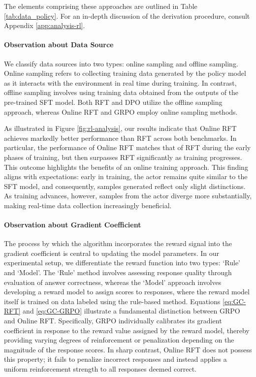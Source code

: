 \begin{itemize}[topsep=0pt]
\begin{itemize}[topsep=0pt]
The elements comprising these approaches are outlined in Table \ref{tab:data_policy}. For an in-depth discussion of the derivation procedure, consult Appendix \ref{app:analysis-rl}.

\paragraph{Observation about Data Source} We classify data sources into two types: online sampling and offline sampling. Online sampling refers to collecting training data generated by the policy model as it interacts with the environment in real time during training. In contrast, offline sampling involves using training data obtained from the outputs of the pre-trained SFT model. Both RFT and DPO utilize the offline sampling approach, whereas Online RFT and GRPO employ online sampling methods.

As illustrated in Figure \ref{fig:rl-analysis}, our results indicate that Online RFT achieves markedly better performance than RFT across both benchmarks. In particular, the performance of Online RFT matches that of RFT during the early phases of training, but then surpasses RFT significantly as training progresses. This outcome highlights the benefits of an online training approach. This finding aligns with expectations: early in training, the actor remains quite similar to the SFT model, and consequently, samples generated reflect only slight distinctions. As training advances, however, samples from the actor diverge more substantially, making real-time data collection increasingly beneficial.

\paragraph{Observation about Gradient Coefficient} The process by which the algorithm incorporates the reward signal into the gradient coefficient is central to updating the model parameters. In our experimental setup, we differentiate the reward function into two types: `Rule' and `Model'. The `Rule' method involves assessing response quality through evaluation of answer correctness, whereas the `Model' approach involves developing a reward model to assign scores to responses, where the reward model itself is trained on data labeled using the rule-based method. Equations \ref{eq:GC-RFT} and \ref{eq:GC-GRPO} illustrate a fundamental distinction between GRPO and Online RFT. Specifically, GRPO individually calibrates its gradient coefficient in response to the reward value assigned by the reward model, thereby providing varying degrees of reinforcement or penalization depending on the magnitude of the response scores. In sharp contrast, Online RFT does not possess this property; it fails to penalize incorrect responses and instead applies a uniform reinforcement strength to all responses deemed correct.


\end{itemize}
\end{itemize}
